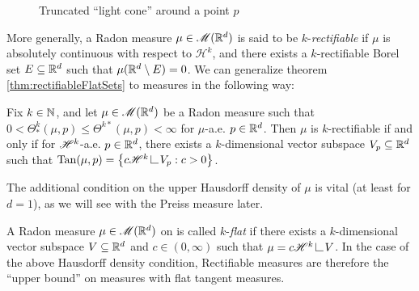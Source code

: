 \begin{figure}
    \centering
    \caption{Truncated ``light cone'' around a point $p$}
    \label{fig:cone}
\end{figure}

More generally, a Radon measure $\mu \in \mathscr{M}(\mathbb{R}^d)$ is said to be $k$-\textit{rectifiable} if $\mu$ is absolutely continuous with respect to $\mathscr{H}^k$, and there exists a $k$-rectifiable Borel set $E \subseteq \mathbb{R}^d$ such that $\mu(\mathbb{R}^d \setminus E) = 0$. We can generalize theorem \ref{thm:rectifiableFlatSets} to measures in the following way:
\begin{theorem} \label{thm:rectifiableFlatMeasures}
    Fix $k \in \mathbb{N}$, and let $\mu \in \mathscr{M}(\mathbb{R}^d)$ be a Radon measure such that $0 < \Theta_*^k(\mu,p) \leq \Theta^{k*}(\mu,p) < \infty$ for $\mu$-a.e. $p \in \mathbb{R}^d$. Then $\mu$ is $k$-rectifiable if and only if for $\mathscr{H}^k$-a.e. $p \in \mathbb{R}^d$, there exists a $k$-dimensional vector subspace $V_p \subseteq \mathbb{R}^d$ such that $\Tan(\mu,p) = \set{ c \scrH^k \restrict V_p : c > 0 }$.
\end{theorem}
The additional condition on the upper Hausdorff density of $\mu$ is vital (at least for $d=1$), as we will see with the Preiss measure later.

A Radon measure $\mu \in \mathscr{M}(\mathbb{R}^d)$ on is called $k$-\textit{flat} if there exists a $k$-dimensional vector subspace $V \subseteq \mathbb{R}^d$ and $c \in (0,\infty)$ such that $\mu = c \mathscr{H}^k \restrict V$. In the case of the above Hausdorff density condition, Rectifiable measures are therefore the ``upper bound'' on measures with flat tangent measures.
